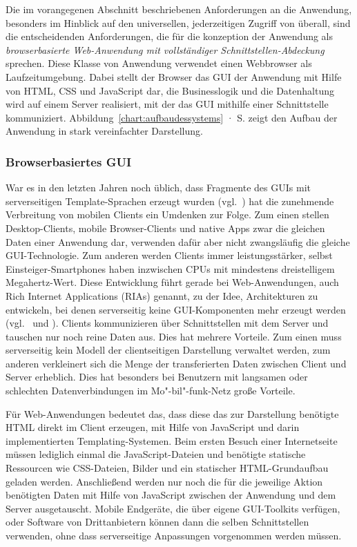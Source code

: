 Die im vorangegenen Abschnitt beschriebenen Anforderungen an die Anwendung, besonders im Hinblick auf den universellen, jederzeitigen Zugriff von überall, sind die entscheidenden Anforderungen, die für die konzeption der Anwendung als \emph{browserbasierte Web-Anwendung mit vollständiger Schnittstellen-Abdeckung} sprechen. Diese Klasse von Anwendung verwendet einen Webbrowser als Laufzeitumgebung. Dabei stellt der Browser das GUI der Anwendung mit Hilfe von HTML, CSS und JavaScript dar, die Businesslogik und die Datenhaltung wird auf einem Server realisiert, mit der das GUI mithilfe einer Schnittstelle kommuniziert. Abbildung~\ref{chart:aufbaudessystems} · S.\pageref{chart:aufbaudessystems} zeigt den Aufbau der Anwendung in stark vereinfachter Darstellung. 

\subsubsection{Browserbasiertes GUI}

War es in den letzten Jahren noch üblich, dass Fragmente des GUIs mit serverseitigen Template-Sprachen erzeugt wurden (vgl.~\cite[S.48]{dunkel2008systemarchitekturen}) hat die zunehmende Verbreitung von mobilen Clients ein Umdenken zur Folge. Zum einen stellen Desktop-Clients, mobile Browser-Clients und native Apps zwar die gleichen Daten einer Anwendung dar, verwenden dafür aber nicht zwangsläufig die gleiche GUI-Technologie. Zum anderen werden Clients immer leistungsstärker, selbst Einsteiger-Smartphones haben inzwischen CPUs mit mindestens dreistelligem Megahertz-Wert. Diese Entwicklung führt gerade bei Web-Anwendungen, auch Rich Internet Applications (RIAs) genannt, zu der Idee, Architekturen zu entwickeln, bei denen serverseitig keine GUI-Komponenten mehr erzeugt werden (vgl.~\cite{maccaw2011javascript} und \cite{coates2012phptemplating}). Clients kommunizieren über Schnittstellen mit dem Server und tauschen nur noch reine Daten aus. Dies hat mehrere Vorteile. Zum einen muss serverseitig kein Modell der clientseitigen Darstellung verwaltet werden, zum anderen verkleinert sich die Menge der transferierten Daten zwischen Client und Server erheblich. Dies hat besonders bei Benutzern mit langsamen oder schlechten Datenverbindungen im Mo"-bil"-funk-Netz große Vorteile. 

Für Web-Anwendungen bedeutet das, dass diese das zur Darstellung benötigte HTML direkt im Client erzeugen, mit Hilfe von JavaScript und darin implementierten Templating-Systemen. Beim ersten Besuch einer Internetseite müssen lediglich einmal die JavaScript-Dateien und benötigte statische Ressourcen wie CSS-Dateien, Bilder und ein statischer HTML-Grundaufbau geladen werden. Anschließend werden nur noch die für die jeweilige Aktion benötigten Daten mit Hilfe von JavaScript zwischen der Anwendung und dem Server ausgetauscht. Mobile Endgeräte, die über eigene GUI-Toolkits verfügen, oder Software von Drittanbietern können dann die selben Schnittstellen verwenden, ohne dass serverseitige Anpassungen vorgenommen werden müssen.

